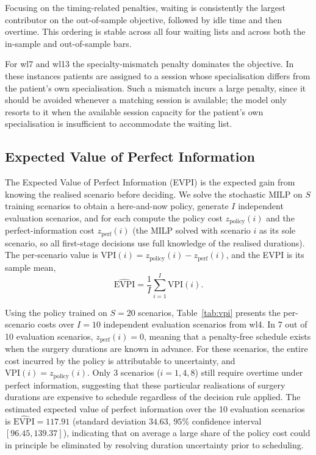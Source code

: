 Focusing on the timing-related penalties, waiting is consistently the largest contributor on the out-of-sample objective, followed by idle time and then overtime. This ordering is stable across all four waiting lists and across both the in-sample and out-of-sample bars.

For wl7 and wl13 the specialty-mismatch penalty dominates the objective. In these instances patients are assigned to a session whose specialisation differs from the patient's own specialisation. Such a mismatch incurs a large penalty, since it should be avoided whenever a matching session is available; the model only resorts to it when the available session capacity for the patient's own specialisation is insufficient to accommodate the waiting list.

\subsection{Expected Value of Perfect Information}
\label{subsec:EVPI}

The Expected Value of Perfect Information (EVPI) is the expected gain from
knowing the realised scenario before deciding. We solve the stochastic MILP on
$S$ training scenarios to obtain a here-and-now policy, generate $I$ independent
evaluation scenarios, and for each compute the policy cost $z_{\text{policy}}(i)$
and the perfect-information cost $z_{\text{perf}}(i)$ (the MILP solved with
scenario $i$ as its sole scenario, so all first-stage decisions use full
knowledge of the realised durations). The per-scenario value is
$\text{VPI}(i) = z_{\text{policy}}(i) - z_{\text{perf}}(i)$, and the EVPI
is its sample mean,
\[
    \widehat{\text{EVPI}} = \frac{1}{I} \sum_{i=1}^{I} \text{VPI}(i).
\]

Using the policy trained on $S = 20$ scenarios, Table~\ref{tab:vpi} presents
the per-scenario costs over $I = 10$ independent evaluation scenarios from wl4. In 7 out
of 10 evaluation scenarios, $z_{\text{perf}}(i) = 0$, meaning that a
penalty-free schedule exists when the surgery durations are known in advance.
For these scenarios, the entire cost incurred by the policy is attributable to
uncertainty, and $\text{VPI}(i) = z_{\text{policy}}(i)$. Only 3 scenarios
($i = 1,4,8$) still require overtime under perfect
information, suggesting that these particular realisations of surgery durations
are expensive to schedule regardless of the decision rule applied. The estimated
expected value of perfect information over the 10 evaluation scenarios is
$\widehat{\text{EVPI}} = 117.91$ (standard deviation $34.63$, $95\%$ confidence
interval $[96.45, 139.37]$), indicating that on average a large share of the
policy cost could in principle be eliminated by resolving duration uncertainty
prior to scheduling.

